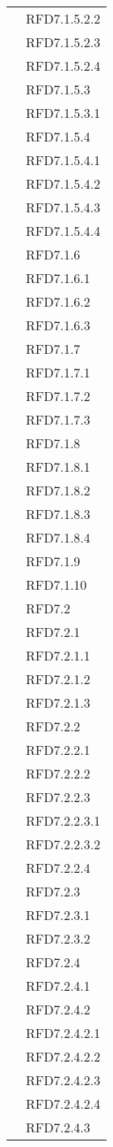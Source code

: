 \begin{longtable}{|>{\centering}m{10cm}|m{3cm}<{\centering}|}
& RFD7.1.5.2.2\\
& RFD7.1.5.2.3\\
& RFD7.1.5.2.4\\
& RFD7.1.5.3\\
& RFD7.1.5.3.1\\
& RFD7.1.5.4\\
& RFD7.1.5.4.1\\
& RFD7.1.5.4.2\\
& RFD7.1.5.4.3\\
& RFD7.1.5.4.4\\
& RFD7.1.6\\
& RFD7.1.6.1\\
& RFD7.1.6.2\\
& RFD7.1.6.3\\
& RFD7.1.7\\
& RFD7.1.7.1\\
& RFD7.1.7.2\\
& RFD7.1.7.3\\
& RFD7.1.8\\
& RFD7.1.8.1\\
& RFD7.1.8.2\\
& RFD7.1.8.3\\
& RFD7.1.8.4\\
& RFD7.1.9\\
& RFD7.1.10\\
& RFD7.2\\
& RFD7.2.1\\
& RFD7.2.1.1\\
& RFD7.2.1.2\\
& RFD7.2.1.3\\
& RFD7.2.2\\
& RFD7.2.2.1\\
& RFD7.2.2.2\\
& RFD7.2.2.3\\
& RFD7.2.2.3.1\\
& RFD7.2.2.3.2\\
& RFD7.2.2.4\\
& RFD7.2.3\\
& RFD7.2.3.1\\
& RFD7.2.3.2\\
& RFD7.2.4\\
& RFD7.2.4.1\\
& RFD7.2.4.2\\
& RFD7.2.4.2.1\\
& RFD7.2.4.2.2\\
& RFD7.2.4.2.3\\
& RFD7.2.4.2.4\\
& RFD7.2.4.3\\

\end{longtable}

